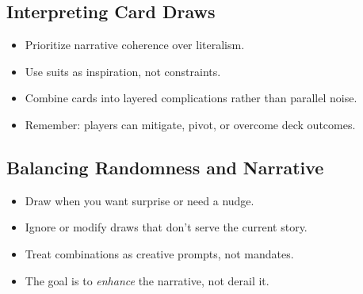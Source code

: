 \subsection{Interpreting Card Draws}
\label{subsec:card-interpretation}

\begin{itemize}
\item Prioritize narrative coherence over literalism.
\item Use suits as inspiration, not constraints.
\item Combine cards into layered complications rather than parallel noise.
\item Remember: players can mitigate, pivot, or overcome deck outcomes.
\end{itemize}

\subsection{Balancing Randomness and Narrative}
\label{subsec:balancing-randomness}

\begin{itemize}
\item Draw when you want surprise or need a nudge.
\item Ignore or modify draws that don’t serve the current story.
\item Treat combinations as creative prompts, not mandates.
\item The goal is to \emph{enhance} the narrative, not derail it.
\end{itemize}



